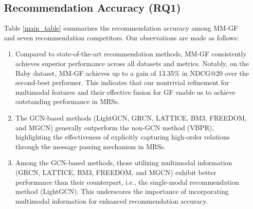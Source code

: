 \documentclass[a4paper,fleqn]{cas-sc}
\begin{document}
\subsection{Recommendation Accuracy (RQ1)}
\label{Accuracy}

Table \ref{main_table} summarizes the recommendation accuracy among \textsf{MM-GF} and seven recommendation competitors. Our observations are made as follows:
\begin{enumerate}[label=(\roman*)]
    \item Compared to state-of-the-art recommendation methods, \textsf{MM-GF} consistently achieves superior performance across all datasets and metrics. Notably, on the Baby dataset, \textsf{MM-GF} achieves up to a gain of 13.35\% in NDCG@$20$ over the second-best performer. This indicates that our nontrivial refinement for multimodal features and their effective fusion for GF enable us to achieve outstanding performance in MRSs.

    \item The GCN-based methods (LightGCN, GRCN, LATTICE, BM3, FREEDOM, and MGCN) generally outperform the non-GCN method (VBPR), highlighting the effectiveness of explicitly capturing high-order relations through the message passing mechanism in MRSs.

    \item Among the GCN-based methods, those utilizing multimodal information (GRCN, LATTICE, BM3, FREEDOM, and MGCN) exhibit better performance than their counterpart, i.e., the single-modal recommendation method (LightGCN). This underscores the importance of incorporating multimodal information for enhanced recommendation accuracy.
\end{enumerate}
\end{document}
